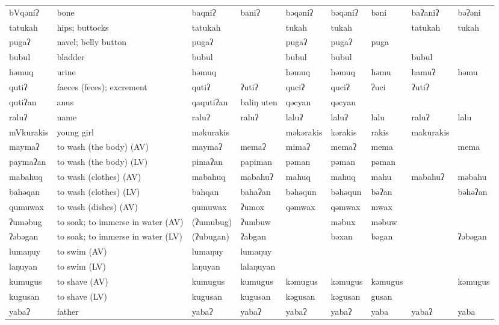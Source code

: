 \begin{landscape}
\begin{longtable}{*{9}{>{\raggedright\arraybackslash}p{}}}
\text{*}bVqəniʔ & bone & baqniʔ & baniʔ & bəqəniʔ & bəqəniʔ & bəni & baʔaniʔ & bəʔəni\\
\text{*}tatukah & hips; buttocks & tatukah &  & tukah & tukah &  & tatukah & tukah\\
\text{*}pugaʔ & navel; belly button & pugaʔ &  & pugaʔ & pugaʔ & puga &  & \\
\text{*}bubul & bladder & bubul &  & bubul & bubul &  & bubul & \\
\text{*}həmuq & urine & həmuq &  & həmuq & həmuq & həmu & hamuʔ & həmu\\
\text{*}qutiʔ & faeces (feces); excrement & qutiʔ & ʔutiʔ & quciʔ & quciʔ & ʔuci & ʔutiʔ & \\
\text{*}qutiʔan & anus & qaqutiʔan & baliŋ uten & qəcyan & qəcyan &  &  & \\
\text{*}raluʔ & name & raluʔ & raluʔ & laluʔ & laluʔ & lalu & raluʔ & lalu\\
\text{*}mVkurakis & young girl & məkurakis &  & məkərakis & kərakis & rakis & makurakis & \\
\text{*}maymaʔ & to wash (the body) (AV) & maymaʔ & memaʔ & mimaʔ & memaʔ & mema &  & mema\\
\text{*}paymaʔan & to wash (the body) (LV) & pimaʔan & papiman & pəman & pəman & pəman &  & \\
\text{*}mabahuq & to wash (clothes) (AV) & mabahuq & mabahuʔ & mahuq & mahuq & mahu & mabahuʔ & məbahu\\
\text{*}bahəqan & to wash (clothes) (LV) & bahqan & bahaʔan & bəhəqun & bəhəqun & bəʔan &  & bəhəʔan\\
\text{*}qumuwax & to wash (dishes) (AV) & qumuwax & ʔumox & qəmwax & qəmwax & mwax &  & \\
\text{*}ʔuməbug & to soak; to immerse in water (AV) & (ʔumubug) & ʔumbuw &  & məbux & məbuw &  & \\
\text{*}ʔəbəgan & to soak; to immerse in water (LV) & (ʔubugan) & ʔabgan &  & bəxan & bəgan &  & ʔəbəgan\\
\text{*}lumaŋuy & to swim (AV) & lumaŋuy & lumaŋuy &  &  &  &  & \\
\text{*}laŋuyan & to swim (LV) & laŋuyan & lalaŋuyan &  &  &  &  & \\
\text{*}kumugus & to shave (AV) & kumugus & kumugus & kəmugus & kəmugus & kəmugus &  & kəmugus\\
\text{*}kugusan & to shave (LV) & kugusan & kugusan & kəgusan & kəgusan & gusan &  & \\
\text{*}yabaʔ & father & yabaʔ & yabaʔ & yabaʔ & yabaʔ & yaba & yabaʔ & yaba\\

\end{longtable}
\end{landscape}
